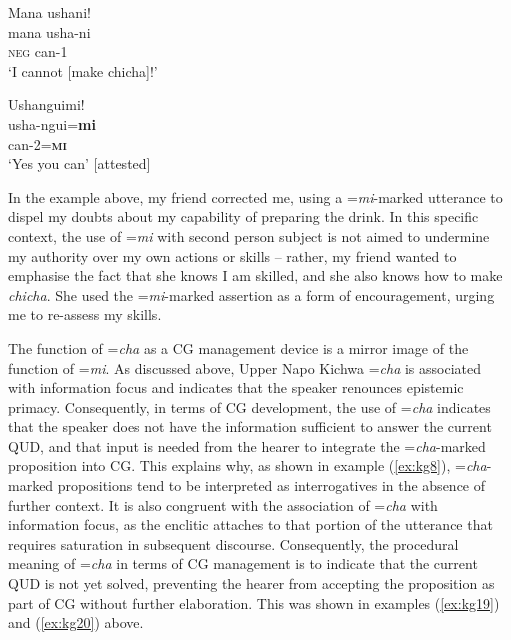 \documentclass[output=paper]{langscibook}
\begin{document}
\begin{exe}
	\ex \label{ex:kg21}
	\begin{xlist}
		\ex \label{ex:kg21a}
		\glll Mana  ushani!\\
		mana   usha-ni\\
		\textsc{neg} can-1\\
		\trans ‘I cannot [make chicha]!’
		
		\ex  \label{ex:kg21b}
		\glll Ushanguimi!\\
		usha-ngui=\textbf{mi}\\
        can-2=\textbf{\textsc{mi}}\\
        \trans ‘Yes you can’ [attested]
	\end{xlist}
\end{exe}

In the example above, my friend corrected me, using a =\textit{mi}-marked utterance to dispel my doubts about my capability of preparing the drink. In this specific context, the use of =\textit{mi} with second person subject is not aimed to undermine my authority over my own actions or skills – rather, my friend wanted to emphasise the fact that she knows I am skilled, and she also knows how to make \textit{chicha}. She used the =\textit{mi}-marked assertion as a form of encouragement, urging me to re-assess my skills.

The function of =\textit{cha} as a CG management device is a mirror image of the function of =\textit{mi}. As discussed above, Upper Napo Kichwa =\textit{cha} is associated with information focus and indicates that the speaker renounces epistemic primacy. Consequently, in terms of CG development, the use of =\textit{cha} indicates that the speaker does not have the information sufficient to answer the current QUD, and that input is needed from the hearer to integrate the =\textit{cha}-marked proposition into CG. This explains why, as shown in example (\ref{ex:kg8}), =\textit{cha}-marked propositions tend to be interpreted as interrogatives in the absence of further context. It is also congruent with the association of =\textit{cha} with information focus, as the enclitic attaches to that portion of the utterance that requires saturation in subsequent discourse. Consequently, the procedural meaning of =\textit{cha} in terms of CG management is to indicate that the current QUD is not yet solved, preventing the hearer from accepting the proposition as part of CG without further elaboration. This was shown in examples (\ref{ex:kg19}) and (\ref{ex:kg20}) above.
\end{document}
